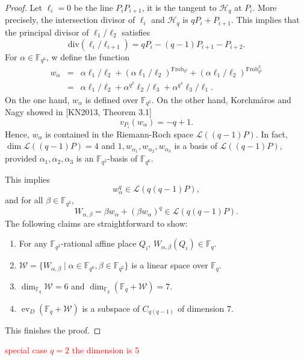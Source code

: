 \documentclass[11pt]{amsart}
\theoremstyle{plain}
\theoremstyle{definition}
\theoremstyle{remark}
\DeclareMathOperator{\ev}{ev}
\begin{document}
\begin{proof}
	Let $\ell_i=0$ be the line $P_iP_{i+1}$, it is the tangent to $\mathscr{H}_q$ at $P_i$. More precisely, the intersection divisor of $\ell_i$ and $\mathscr{H}_q$ is $qP_i+P_{i+1}$. This implies that the principal divisor of $\ell_1/\ell_2$ satisfies
	\[\mathrm{div}(\ell_i/\ell_{i+1})=qP_i-(q-1)P_{i+1}-P_{i+2}.\]
	For $\alpha \in \mathbb{F}_{q^6}$, w define the function
	\begin{eqnarray*}
		w_\alpha&=&\alpha\ell_1/\ell_2+(\alpha\ell_1/\ell_2)^{\mathrm{Frob}_{q^2}}+(\alpha\ell_1/\ell_2)^{\mathrm{Frob}_{q^2}^2}\\
		&=&\alpha\ell_1/\ell_2+\alpha^{q^2}\ell_2/\ell_3+\alpha^{q^4}\ell_3/\ell_1.
	\end{eqnarray*}
	On the one hand, $w_\alpha$ is defined over $\mathbb{F}_{q^2}$. On the other hand, Korchm\'aros and Nagy showed in [KN2013, Theorem 3.1]
	\[v_{P_i}(w_\alpha)=-q+1.\]
	Hence, $w_\alpha$ is contained in the Riemann-Roch space $\mathscr{L}((q-1)P)$. In fact, $\dim\mathscr{L}((q-1)P)=4$ and $1,w_{\alpha_1}, w_{\alpha_2}, w_{\alpha_3}$ is a basis of $\mathscr{L}((q-1)P)$, provided $\alpha_1,\alpha_2,\alpha_3$ is an $\mathbb{F}_{q^2}$-basis of $\mathbb{F}_{q^6}$. 
	
	This implies
	\[w_\alpha^q\in \mathscr{L}(q(q-1)P),\]
	and for all $\beta \in \mathbb{F}_{q^2}$, 
	\[W_{\alpha,\beta}=\beta w_\alpha +(\beta w_\alpha)^q\in \mathscr{L}(q(q-1)P).\]
	The following claims are straightforward to show:
	\begin{enumerate}
		\item For any $\mathbb{F}_{q^2}$-rational affine place $Q_i$, $W_{\alpha,\beta}(Q_i)\in \mathbb{F}_q$.
		\item $\mathcal{W}=\{W_{\alpha,\beta} \mid \alpha \in \mathbb{F}_{q^6}, \beta \in \mathbb{F}_{q^2}\}$ is a linear space over $\mathbb{F}_q$.
		\item $\dim_{\mathbb{F}_q}\mathcal{W}=6$ and $\dim_{\mathbb{F}_q}(\mathbb{F}_q+ \mathcal{W})=7$.
		\item $\ev_D(\mathbb{F}_q+ \mathcal{W})$ is a subspace of $C_{q(q-1)}$ of dimension $7$.
	\end{enumerate}
	This finishes the proof.
	
	
\end{proof}


\textcolor{red}{special case $q=2$ the dimension is 5 }






\end{document}
